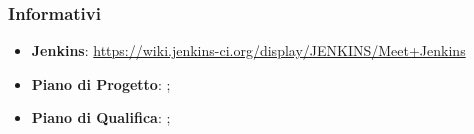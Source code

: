      \subsubsection{Informativi}
     \begin{itemize}
       \item \textbf{Jenkins}: \url{https://wiki.jenkins-ci.org/display/JENKINS/Meet+Jenkins}
       \item \textbf{Piano di Progetto}: \href{run:../../Interni/\fPianoDiProgetto}{\fEscapePianoDiProgetto};
       \item \textbf{Piano di Qualifica}:  \href{run:../../Interni/\fPianoDiQualifica}{\fEscapePianoDiQualifica};
     \end{itemize}
        